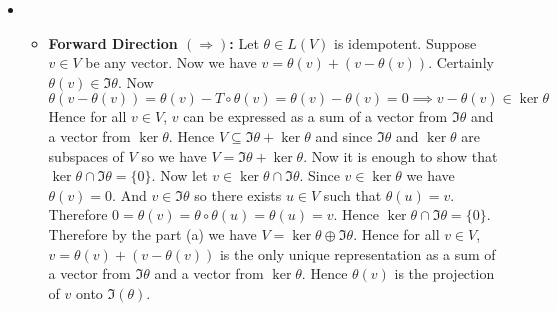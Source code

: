 \documentclass[a4paper, 11pt]{article}
\begin{document}
{\begin{itemize}
	\item \begin{itemize}
		\item \textbf{Forward Direction $\boldsymbol{(\Rightarrow)}$:} Let $\theta\in L(V)$ is idempotent. Suppose $v\in V$ be any vector. Now we have $v=\theta(v)+(v-\theta(v))$. Certainly $\theta(v)\in \Im \theta$. Now $$\theta(v-\theta(v))=\theta(v)-T\circ \theta(v)=\theta(v)-\theta(v)=0\implies v-\theta(v)\in \ker\theta$$ Hence for all $v\in V$, $v$ can be expressed as a sum of a vector from $\Im\theta$ and a vector from $\ker \theta$. Hence $V\subseteq \Im\theta +\ker\theta$ and since $\Im\theta $ and $\ker\theta$ are subspaces of $V$ so we have $V=\Im\theta+\ker\theta$. Now it is enough to show that $\ker\theta\cap \Im\theta=\{0\}$. Now let $v\in\ker\theta\cap \Im\theta$. Since $v\in \ker\theta$ we have $\theta(v)=0$. And $v\in\Im\theta$ so there exists $u\in V$ such that $\theta(u)=v$. Therefore $0=\theta(v)=\theta\circ \theta(u)=\theta(u)=v$. Hence $\ker\theta\cap \Im\theta=\{0\}$. Therefore by the part (a) we have $V=\ker\theta\oplus \Im\theta$. Hence for all $v\in V$, $v=\theta(v)+(v-\theta(v))$ is the only unique representation as a sum of a vector from $\Im\theta $ and a vector from $\ker\theta$. Hence $\theta(v)$ is the projection of $v$ onto $\Im(\theta)$. 
		

\end{itemize}
\end{itemize}}
\end{document}
